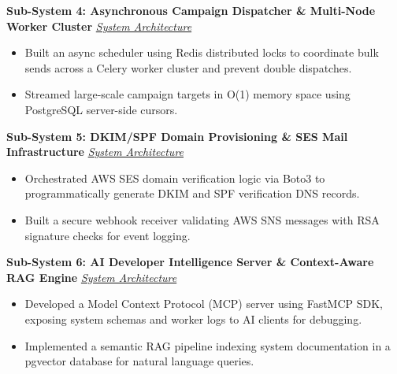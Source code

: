 \documentclass[10pt,a4paper]{article}
\begin{document}
\noindent\textbf{Sub-System 4: Asynchronous Campaign Dispatcher \& Multi-Node Worker Cluster} \hfill \href{https://github.com/Rahul-pamula/ShrFlow-V1/blob/main/docs/projects/4_campaign_dispatcher.md}{\small\textit{System Architecture}}
\begin{itemize}[leftmargin=1.2em, topsep=1pt, itemsep=1pt, parsep=0pt, partopsep=0pt]
    \item Built an async scheduler using Redis distributed locks to coordinate bulk sends across a Celery worker cluster and prevent double dispatches.
    \item Streamed large-scale campaign targets in O(1) memory space using PostgreSQL server-side cursors.
\end{itemize}

\vspace{3pt}

\noindent\textbf{Sub-System 5: DKIM/SPF Domain Provisioning \& SES Mail Infrastructure} \hfill \href{https://github.com/Rahul-pamula/ShrFlow-V1/blob/main/docs/projects/5_domain_provisioning.md}{\small\textit{System Architecture}}
\begin{itemize}[leftmargin=1.2em, topsep=1pt, itemsep=1pt, parsep=0pt, partopsep=0pt]
    \item Orchestrated AWS SES domain verification logic via Boto3 to programmatically generate DKIM and SPF verification DNS records.
    \item Built a secure webhook receiver validating AWS SNS messages with RSA signature checks for event logging.
\end{itemize}

\vspace{3pt}

\noindent\textbf{Sub-System 6: AI Developer Intelligence Server \& Context-Aware RAG Engine} \hfill \href{https://github.com/Rahul-pamula/ShrFlow-V1/blob/main/docs/projects/6_mcp_developer_intelligence.md}{\small\textit{System Architecture}}
\begin{itemize}[leftmargin=1.2em, topsep=1pt, itemsep=1pt, parsep=0pt, partopsep=0pt]
    \item Developed a Model Context Protocol (MCP) server using FastMCP SDK, exposing system schemas and worker logs to AI clients for debugging.
    \item Implemented a semantic RAG pipeline indexing system documentation in a pgvector database for natural language queries.
\end{itemize}

\vspace{4pt}
\end{document}
